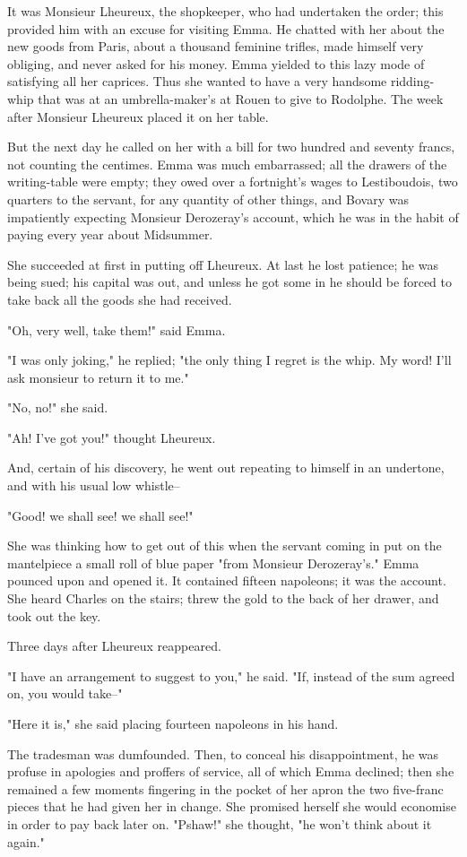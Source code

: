 \documentclass[11pt,twocolumn]{ltugboat}
\begin{document}
It was Monsieur Lheureux, the shopkeeper, who had undertaken the order;
this provided him with an excuse for visiting Emma. He chatted with her
about the new goods from Paris, about a thousand feminine trifles, made
himself very obliging, and never asked for his money. Emma yielded to
this lazy mode of satisfying all her caprices. Thus she wanted to have
a very handsome ridding-whip that was at an umbrella-maker's at Rouen
to give to Rodolphe. The week after Monsieur Lheureux placed it on her
table.

But the next day he called on her with a bill for two hundred and
seventy francs, not counting the centimes. Emma was much embarrassed;
all the drawers of the writing-table were empty; they owed over a
fortnight's wages to Lestiboudois, two quarters to the servant, for any
quantity of other things, and Bovary was impatiently expecting Monsieur
Derozeray's account, which he was in the habit of paying every year
about Midsummer.

She succeeded at first in putting off Lheureux. At last he lost
patience; he was being sued; his capital was out, and unless he got some
in he should be forced to take back all the goods she had received.

"Oh, very well, take them!" said Emma.

"I was only joking," he replied; "the only thing I regret is the whip.
My word! I'll ask monsieur to return it to me."

"No, no!" she said.

"Ah! I've got you!" thought Lheureux.

And, certain of his discovery, he went out repeating to himself in an
undertone, and with his usual low whistle--

"Good! we shall see! we shall see!"

She was thinking how to get out of this when the servant coming in
put on the mantelpiece a small roll of blue paper "from Monsieur
Derozeray's." Emma pounced upon and opened it. It contained fifteen
napoleons; it was the account. She heard Charles on the stairs; threw
the gold to the back of her drawer, and took out the key.

Three days after Lheureux reappeared.

"I have an arrangement to suggest to you," he said. "If, instead of the
sum agreed on, you would take--"

"Here it is," she said placing fourteen napoleons in his hand.

The tradesman was dumfounded. Then, to conceal his disappointment, he
was profuse in apologies and proffers of service, all of which Emma
declined; then she remained a few moments fingering in the pocket of
her apron the two five-franc pieces that he had given her in change.
She promised herself she would economise in order to pay back later on.
"Pshaw!" she thought, "he won't think about it again."
\end{document}
